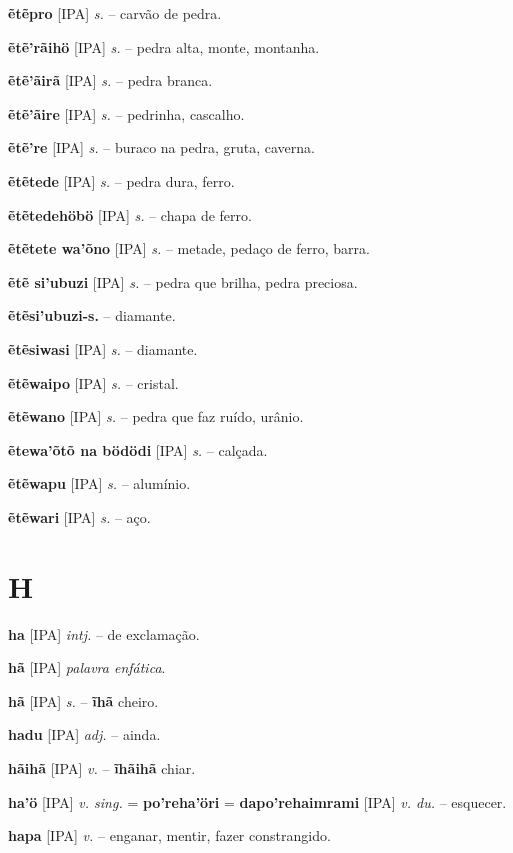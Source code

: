 \textbf{ẽtẽpro} [IPA] \textit{s.} -- carvão de pedra.

\textbf{ẽtẽ'rãihö} [IPA] \textit{s.} -- pedra alta, monte, montanha.

\textbf{ẽtẽ'ãirã} [IPA] \textit{s.} -- pedra branca.

\textbf{ẽtẽ'ãire} [IPA] \textit{s.} -- pedrinha, cascalho.

\textbf{ẽtẽ're} [IPA] \textit{s.} -- buraco na pedra, gruta, caverna.

\textbf{ẽtẽtede} [IPA] \textit{s.} -- pedra dura, ferro.

\textbf{ẽtẽtedehöbö} [IPA] \textit{s.} -- chapa de ferro.

\textbf{ẽtẽtete wa'õno} [IPA] \textit{s.} -- metade, pedaço de ferro, barra.

\textbf{ẽtẽ si'ubuzi} [IPA] \textit{s.} -- pedra que brilha, pedra preciosa.

\textbf{ẽtẽsi'ubuzi-s.} -- diamante.

\textbf{ẽtẽsiwasi} [IPA] \textit{s.} -- diamante.

\textbf{ẽtẽwaipo} [IPA] \textit{s.} -- cristal.

\textbf{ẽtẽwano} [IPA] \textit{s.} -- pedra que faz ruído, urânio.

\textbf{ẽtewa'õtõ na bödödi} [IPA] \textit{s.} -- calçada.

\textbf{ẽtẽwapu} [IPA] \textit{s.} -- alumínio.

\textbf{ẽtẽwari} [IPA] \textit{s.} -- aço.


\section*{H}



\textbf{ha} [IPA] \textit{intj.} -- de exclamação.

\textbf{hã} [IPA] \textit{palavra enfática}.

\textbf{hã} [IPA] \textit{s.} -- \textbf{ĩhã} cheiro.

\textbf{hadu} [IPA] \textit{adj.} -- ainda.

\textbf{hãihã} [IPA] \textit{v.} -- \textbf{ĩhãihã} chiar.

\textbf{ha'ö} [IPA] \textit{v. sing.} = \textbf{po'reha'öri} = \textbf{dapo'rehaimrami} [IPA] \textit{v. du.} -- esquecer.

\textbf{hapa} [IPA] \textit{v.} -- enganar, mentir, fazer constrangido.

